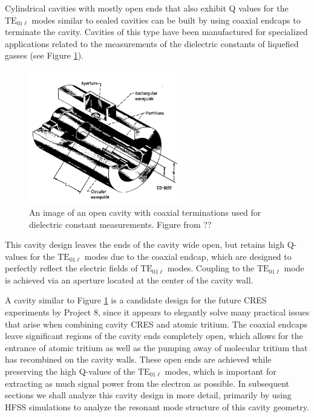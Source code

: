 Cylindrical cavities with mostly open ends that also exhibit Q values for the $\mathrm{TE}_{01\ell}$ modes similar to sealed cavities can be built by using coaxial endcaps to terminate the cavity. Cavities of this type have been manufactured for specialized applications related to the measurements of the dielectric constants of liquefied gasses (see Figure \ref{fig:chap6-open-cavity-image}).
\begin{figure}[htbp]
    \centering
    \includegraphics*[width=0.6\textwidth]{figs/Chapter-6/230606_open_cavity_image.png}
    \caption{\label{fig:chap6-open-cavity-image} An image of an open cavity with coaxial terminations used for dielectric constant measurements. Figure from ??}
\end{figure}
This cavity design leaves the ends of the cavity wide open, but retains high Q-values for the $\mathrm{TE}_{01\ell}$ modes due to the coaxial endcap, which are designed to perfectly reflect the electric fields of $\mathrm{TE}_{01\ell}$ modes. Coupling to the $\mathrm{TE_{01\ell}}$ mode is achieved via an aperture located at the center of the cavity wall. 

A cavity similar to Figure \ref{fig:chap6-open-cavity-image} is a candidate design for the future CRES experiments by Project 8, since it appears to elegantly solve many practical issues that arise when combining cavity CRES and atomic tritium. The coaxial endcaps leave significant regions of the cavity ends completely open, which allows for the entrance of atomic tritium as well as the pumping away of molecular tritium that has recombined on the cavity walls. These open ends are achieved while preserving the high Q-values of the $\mathrm{TE}_{01\ell}$ modes, which is important for extracting as much signal power from the electron as possible. In subsequent sections we shall analyze this cavity design in more detail, primarily by using HFSS simulations to analyze the resonant mode structure of this cavity geometry.

